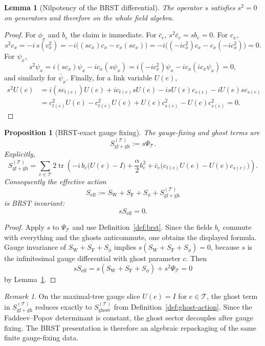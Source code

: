 \documentclass[11pt]{article}
\newtheorem{proposition}[theorem]{Proposition}
\newtheorem{lemma}[theorem]{Lemma}
\theoremstyle{remark}
\newtheorem{remark}[theorem]{Remark}
\newcommand{\mcT}{\mathcal T}
\newcommand{\tr}{\operatorname{tr}}
\begin{document}
\begin{lemma}[Nilpotency of the BRST differential]
\label{lem:brst}
The operator $s$ satisfies $s^2=0$ on generators and therefore on the whole
field algebra.
\end{lemma}
\begin{proof}
For $\phi_x$ and $b_e$ the claim is immediate.  For $\bar c_e$,
$s^2\bar c_e=s b_e=0$.  For $c_x$,
\[
s^2 c_x = -i\,s(c_x^2) = -i\bigl((s c_x)c_x-c_x(s c_x)\bigr)
=-i\bigl((-ic_x^2)c_x-c_x(-ic_x^2)\bigr)=0.
\]
For $\psi_x$,
\[
s^2\psi_x=i(s c_x)\psi_x-i c_x(s\psi_x)
=i(-ic_x^2)\psi_x-i c_x(i c_x\psi_x)=0,
\]
and similarly for $\bar\psi_x$.  Finally, for a link variable $U(e)$,
\begin{align*}
s^2 U(e)
&=
i(s c_{t(e)})U(e)+i c_{t(e)}sU(e)-i sU(e)c_{s(e)}-iU(e)s c_{s(e)}\\
&=
c_{t(e)}^2U(e)-c_{t(e)}^2U(e)+U(e)c_{s(e)}^2-U(e)c_{s(e)}^2=0.
\end{align*}
\end{proof}

\begin{proposition}[BRST-exact gauge fixing]
\label{prop:brst-exact}
The gauge-fixing and ghost terms are
\[
S_{\mathrm{gf+gh}}^{(\mcT)}:=s\Psi_{\mcT}.
\]
Explicitly,
\[
S_{\mathrm{gf+gh}}^{(\mcT)}
=
\sum_{e\in\mcT}2\tr\!\left(
-i\,b_e\bigl(U(e)-I\bigr)+\frac{\alpha}{2}b_e^2
+\bar c_e\bigl(c_{t(e)}U(e)-U(e)c_{s(e)}\bigr)
\right).
\]
Consequently the effective action
\[
S_{\mathrm{eff}}
:=
S_{\mathrm W}+S_{\mathrm F}+S_\phi+S_{\mathrm{gf+gh}}^{(\mcT)}
\]
is BRST invariant:
\[
sS_{\mathrm{eff}}=0.
\]
\end{proposition}
\begin{proof}
Apply $s$ to $\Psi_{\mcT}$ and use Definition~\ref{def:brst}.  Since the
fields $b_e$ commute with everything and the ghosts anticommute, one obtains
the displayed formula.  Gauge invariance of
$S_{\mathrm W}+S_{\mathrm F}+S_\phi$ implies $s(S_{\mathrm W}+S_{\mathrm F}+S_\phi)=0$,
because $s$ is the infinitesimal gauge differential with ghost parameter $c$.
Then
\[
sS_{\mathrm{eff}}
=
s(S_{\mathrm W}+S_{\mathrm F}+S_\phi)+s^2\Psi_{\mcT}=0
\]
by Lemma~\ref{lem:brst}.
\end{proof}

\begin{remark}
On the maximal-tree gauge slice $U(e)=I$ for $e\in\mcT$, the ghost term in
$S_{\mathrm{gf+gh}}^{(\mcT)}$ reduces exactly to
$S_{\mathrm{ghost}}^{(\mcT)}$ from Definition~\ref{def:ghost-action}.  Since
the Faddeev--Popov determinant is constant, the ghost sector decouples after
gauge fixing.  The BRST presentation is therefore an algebraic repackaging of
the same finite gauge-fixing data.
\end{remark}
\end{document}
